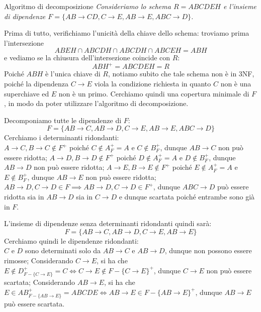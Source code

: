 \begin{Example}{Algoritmo di decomposizione}{}
    \textit{Consideriamo lo schema $R = ABCDEH$ e l'insieme di dipendenze $F = \{AB\to CD, C\to E, AB\to E, ABC\to D\}$.}

     Prima di tutto, verifichiamo l'unicità della chiave dello schema: troviamo prima l'intersezione
     \begin{equation*}
         ABEH\cap ABCDH\cap ABCDH\cap ABCEH = ABH
     \end{equation*}
     e vediamo se la chiusura dell'intersezione coincide con $R$:
    \begin{equation*}
        ABH^+ = ABCDEH = R
    \end{equation*}
    Poiché $ABH$ è l'unica chiave di $R$, notiamo subito che tale schema non è in 3NF, poiché la dipendenza $C\to E$ viola la condizione richiesta in quanto $C$ non è una superchiave ed $E$ non è un primo. Cerchiamo quindi una copertura minimale di $F$, in modo da poter utilizzare l'algoritmo di decomposizione.

    Decomponiamo tutte le dipendenze di $F$:
    \begin{equation*}
        F = \{AB\to C, AB\to D, C\to E, AB\to E, ABC\to D\}
    \end{equation*}
    Cerchiamo i determinanti ridondanti:\\
    $A\to C, B\to C \notin F^+$ poiché $C \notin A^+_F = A$ e $C \notin B^+_F$, dunque $AB\to C$ non può essere ridotta; $A\to D, B\to D \notin F^+$ poiché $D \notin A^+_F = A$ e $D \notin B^+_F$, dunque $AB\to D$ non può essere ridotta; $A\to E, B\to E \notin F^+$ poiché $E \notin A^+_F = A$ e $E \notin B^+_F$, dunque $AB\to E$ non può essere ridotta; $AB\to D, C\to D \in F \implies AB\to D, C\to D \in F^+$, dunque $ABC\to D$ può essere ridotta sia in $AB\to D$ sia in $C\to D$ e dunque scartata poiché entrambe sono già in $F$. 
    
    L'insieme di dipendenze senza determinanti ridondanti quindi sarà:
    \begin{equation*}
        F = \{AB\to C, AB\to D, C\to E, AB\to E\}
    \end{equation*}
    Cerchiamo quindi le dipendenze ridondanti:\\
    $C$ e $D$ sono determinati solo da $AB\to C$ e $AB\to D$, dunque non possono essere rimosse; Considerando $C\to E$, si ha che $E \notin D^+_{F-\{C\to E\}} = C \iff C\to E \notin F-\{C\to E\}^+$, dunque $C\to E$ non può essere scartata; Considerando $AB\to E$, si ha che $E \in AB^+_{F -\{AB\to E\}} = ABCDE \iff AB\to E \in F - \{AB\to E\}^+$, dunque $AB\to E$ può essere scartata.


\end{Example}
